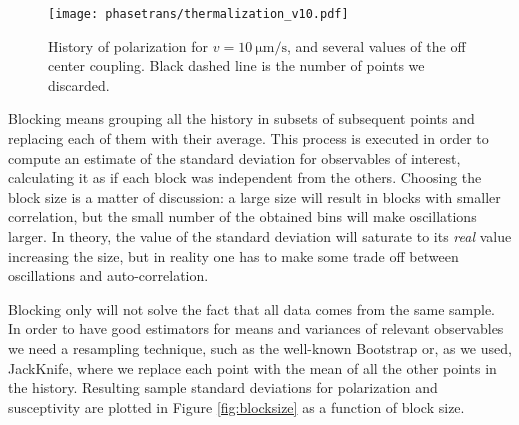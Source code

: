 \documentclass[../../master_thesis_np.tex]{subfiles}
\begin{document}
		\begin{figure}[hbtp]
			\centering
			\texttt{[image: phasetrans/thermalization\_v10.pdf]}
			\caption{History of polarization for $v = \SI{10}{\um\per\second}$, and several values of the off center coupling. Black dashed line is the number of points we discarded.}
			\label{fig:polar_therm}
		\end{figure}
		
		Blocking means grouping all the history in subsets of subsequent points and replacing each of them with their average.
		This process is executed in order to compute an estimate of the standard deviation for observables of interest, calculating it as if each block was independent from the others. 
		Choosing the block size is a matter of discussion: a large size will result in blocks with smaller correlation, but the small number of the obtained bins will make oscillations larger. 
		In theory, the value of the standard deviation will saturate to its \emph{real} value increasing the size, but in reality one has to make some trade off between oscillations and auto-correlation.

		Blocking only will not solve the fact that all data comes from the same sample.
		In order to have good estimators for means and variances of relevant observables we need a resampling technique, such as the well-known Bootstrap or, as we used, JackKnife, where we replace each point with the mean of all the other points in the history.
		Resulting sample standard deviations for polarization and susceptivity are plotted in Figure \ref{fig:blocksize} as a function of block size.
		
\end{document}
